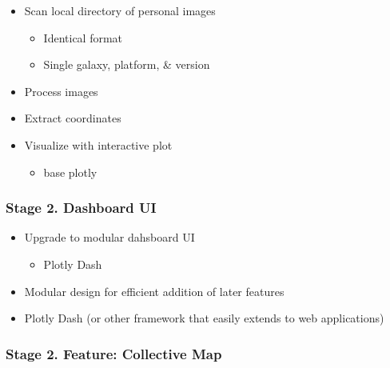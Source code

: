 \documentclass[
]{article}
\providecommand{\tightlist}{%
  \setlength{\itemsep}{0pt}\setlength{\parskip}{0pt}}
\begin{document}
\begin{itemize}
\tightlist
\item
  Scan local directory of personal images

  \begin{itemize}
  \tightlist
  \item
    Identical format\\
  \item
    Single galaxy, platform, \& version\\
  \end{itemize}
\item
  Process images\\
\item
  Extract coordinates\\
\item
  Visualize with interactive plot

  \begin{itemize}
  \tightlist
  \item
    base plotly
  \end{itemize}
\end{itemize}

\hypertarget{stage-2.-dashboard-ui}{%
\subsubsection{Stage 2. Dashboard UI}\label{stage-2.-dashboard-ui}}

\begin{itemize}
\tightlist
\item
  Upgrade to modular dahsboard UI

  \begin{itemize}
  \tightlist
  \item
    Plotly Dash\\
  \end{itemize}
\item
  Modular design for efficient addition of later features\\
\item
  Plotly Dash (or other framework that easily extends to web
  applications)
\end{itemize}

\hypertarget{stage-2.-feature-collective-map}{%
\subsubsection{Stage 2. Feature: Collective
Map}\label{stage-2.-feature-collective-map}}
\end{document}
